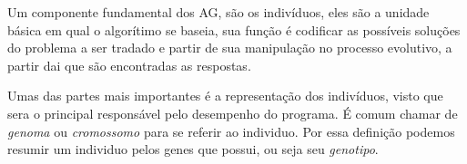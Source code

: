 \begin{minipage}{\linewidth}
\end{minipage}

Um componente fundamental dos AG, são os indivíduos, eles são a unidade básica em qual o algorítimo se baseia, sua função é codificar as possíveis soluções do problema a ser tradado e partir de sua manipulação no processo evolutivo, a partir dai que são encontradas as respostas.

Umas das partes mais importantes é a representação dos indivíduos, visto que sera o principal responsável pelo desempenho do programa. É comum chamar de \textit{genoma} ou \textit{cromossomo} para se referir ao individuo. Por essa definição podemos resumir um individuo pelos genes que possui, ou seja seu \textit{genotipo}.

